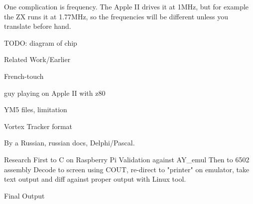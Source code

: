 One complication is frequency.  The Apple II drives it at 1MHz, but for
example the ZX runs it at 1.77MHz, so the frequencies will be different
unless you translate before hand.

TODO: diagram of chip


Related Work/Earlier

	French-touch

	guy playing on Apple II with z80

	YM5 files, limitation

Vortex Tracker format

	By a Russian, russian docs, Delphi/Pascal.


Research
	First to C on Raspberry Pi
	Validation against AY_emul
	Then to 6502 assembly
	Decode to screen using COUT, re-direct to "printer" on emulator,
	take text output and diff against proper output with Linux tool.

Final Output

